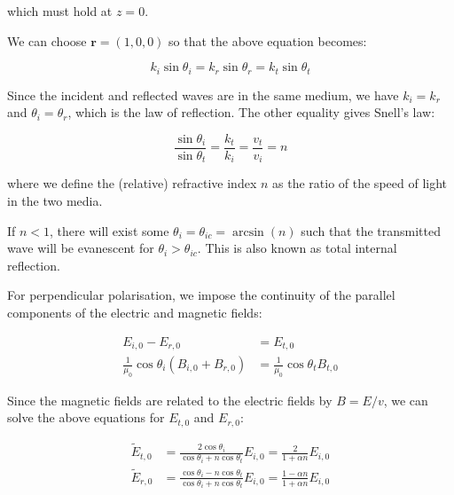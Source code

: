 \documentclass[12pt]{article}
\begin{document}
which must hold at $z = 0$.

We can choose $\mathbf{r} = (1, 0, 0)$ so that the above equation becomes:

\begin{equation}
    k_{i} \sin{\theta_{i}} = k_{r} \sin{\theta_{r}} = k_{t} \sin{\theta_{t}}
\end{equation}

Since the incident and reflected waves are in the same medium, we have $k_{i} = k_{r}$ and $\theta_{i} = \theta_{r}$, which is the law of reflection. The other equality gives Snell's law:

\begin{equation}
    \frac{\sin{\theta_{i}}}{\sin{\theta_{t}}} = \frac{k_{t}}{k_{i}} = \frac{v_{t}}{v_{i}} = n
\end{equation}

where we define the (relative) refractive index $n$ as the ratio of the speed of light in the two media.

If $n < 1$, there will exist some $\theta_{i} = \theta_{ic} = \arcsin{(n)}$ such that the transmitted wave will be evanescent for $\theta_{i} > \theta_{ic}$. This is also known as total internal reflection.

For perpendicular polarisation, we impose the continuity of the parallel components of the electric and magnetic fields:

\begin{equation}
\begin{split}
    E_{i, 0} - E_{r, 0} &= E_{t, 0} \\
    \frac{1}{\mu_{0}} \cos{\theta_{i}} (B_{i, 0} + B_{r, 0}) &= \frac{1}{\mu_{0}} \cos{\theta_{t}} B_{t, 0}
\end{split}
\end{equation}

Since the magnetic fields are related to the electric fields by $B = E/v$, we can solve the above equations for $E_{t, 0}$ and $E_{r, 0}$:

\begin{equation}
\begin{split}
    \tilde{E}_{t, 0} &= \frac{2 \cos{\theta_{i}}}{\cos{\theta_{i}} + n\cos{\theta_{t}}} E_{i, 0} = \frac{2}{1 + \alpha n} E_{i, 0} \\
    \tilde{E}_{r, 0} &= \frac{\cos{\theta_{i}} - n\cos{\theta_{t}}}{\cos{\theta_{i}} + n\cos{\theta_{t}}} E_{i, 0} = \frac{1 - \alpha n}{1 + \alpha n} E_{i, 0}
\end{split}
\end{equation}
\end{document}
